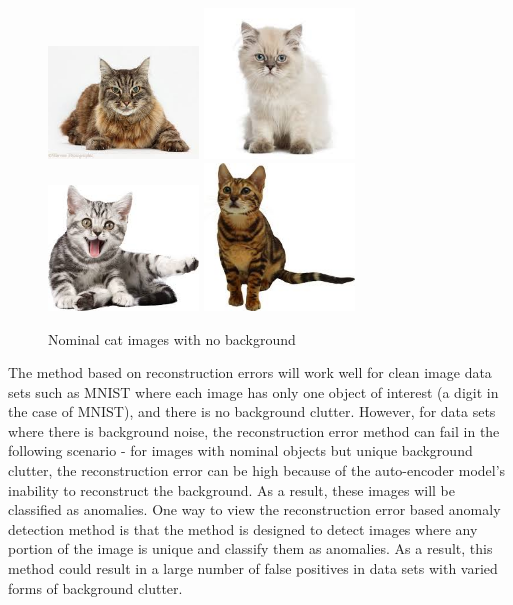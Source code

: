 \documentclass[10pt,twocolumn,letterpaper]{article}
\begin{document}
\begin{figure}[ht!]
\centering
\includegraphics[width=40mm]{figs/cat1.jpeg}
\includegraphics[width=40mm]{figs/cat2.jpeg}
\includegraphics[width=40mm]{figs/cat3.jpeg}
\includegraphics[width=40mm]{figs/cat4.jpeg}
\caption{Nominal cat images with no background\label{overflow}}
\end{figure}



The method based on reconstruction errors will work well for clean image data sets such as MNIST where each image has only one object of interest (a digit in the case of MNIST), and there is no background clutter. However, for data sets where there is background noise, the reconstruction error method can fail in the following scenario - for images with nominal objects but unique background clutter, the reconstruction error can be high because of the auto-encoder model's inability to reconstruct the background. As a result, these images will be classified as anomalies. One way to view the reconstruction error based anomaly detection method is that the method is designed to detect images where any portion of the image is unique and classify them as anomalies. As a result, this method could result in a large number of false positives in data sets with varied forms of background clutter.
\end{document}
